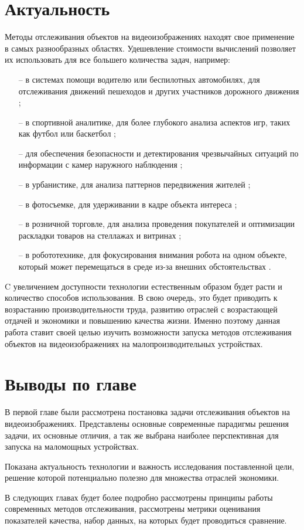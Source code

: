 \section{Актуальность}
Методы отслеживания объектов на видеоизображениях находят свое применение в самых разнообразных областях. 
Удешевление стоимости вычислений позволяет их использовать для все большего количества задач, например:
\begin{itemize}
    \item[--] в системах помощи водителю или беспилотных автомобилях, для отслеживания движений пешеходов и других участников дорожного движения \cite{liu2025vehicle};
    \item[--] в спортивной аналитике, для более глубокого анализа аспектов игр, таких как футбол или баскетбол \cite{naik2022comprehensive};
    \item[--] для обеспечения безопасности и детектирования чрезвычайных ситуаций по информации с камер наружного наблюдения \cite{antony2024advancing};
    \item[--] в урбанистике, для анализа паттернов передвижения жителей \cite{antony2024advancing};
    \item[--] в фотосъемке, для удерживании в кадре объекта интереса \cite{gemerek2019video};  
    \item[--] в розничной торговле, для анализа проведения покупателей и оптимизации раскладки товаров на стеллажах и витринах \cite{hossam2024revolutionizing};
    \item[--] в робототехнике, для фокусирования внимания робота на одном объекте, который может перемещаться в среде из-за внешних обстоятельствах \cite{guo2024adaptive}. 
\end{itemize}

C увеличением доступности технологии естественным образом будет расти и количество способов использования. 
В свою очередь, это будет приводить к возрастанию производительности труда, развитию отраслей с возрастающей отдачей и экономики и повышению качества жизни.
Именно поэтому данная работа ставит своей целью изучить возможности запуска методов отслеживания объектов на видеоизображениях на малопроизводительных устройствах. 

\section{Выводы по главе}
В первой главе были рассмотрена постановка задачи отслеживания объектов на видеоизображениях. Представлены основные современные парадигмы решения задачи,
их основные отличия, а так же выбрана наиболее перспективная для запуска на маломощных устройствах. 

Показана актуальность технологии и важность исследования поставленной цели, решение которой потенциально полезно для множества отраслей экономики.

В следующих главах будет более подробно рассмотрены принципы работы современных методов отслеживания, рассмотрены метрики оценивания показателей качества, набор данных, на которых будет проводиться сравнение.